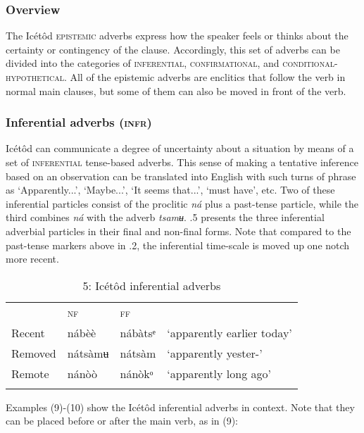 \subsubsection{Overview}

The Icétôd \textsc{epistemic} adverbs express how the speaker feels or thinks about the certainty or contingency of the clause. Accordingly, this set of adverbs can be divided into the categories of \textsc{inferential}, \textsc{confirmational}, and \textsc{conditional-hypothetical}. All of the epistemic adverbs are enclitics that follow the verb in normal main clauses, but some of them can also be moved in front of the verb.


\subsubsection{Inferential adverbs (\textsc{infr})}

Icétôd can communicate a degree of uncertainty about a situation by means of a set of \textsc{inferential} tense-based adverbs. This sense of making a tentative inference based on an observation can be translated into English with such turns of phrase as ‘Apparently...’, ‘Maybe...’, ‘It seems that...’, ‘must have’, etc. Two of these inferential particles consist of the proclitic \textit{ná} plus a past-tense particle, while the third combines \textit{ná} with the adverb \textit{tsamʉ}. .5 presents the three inferential adverbial particles in their final and non-final forms. Note that compared to the past-tense markers above in .2, the inferential time-scale is moved up one notch more recent. 


\begin{table}
\caption{5: Icétôd inferential adverbs}
\label{tab:9}


\begin{tabularx}{\textwidth}{XXXX} & \textsc{nf} & \textsc{ff} & \\
\lsptoprule
Recent & nábèè & nábàtsᵉ & ‘apparently earlier today’\\
Removed & nátsàmʉ & nátsàm & ‘apparently yester-’\\
Remote & nánòò & nánòkᵒ & ‘apparently long ago’\\
\lspbottomrule
\end{tabularx}
\end{table}
Examples (9)-(10) show the Icétôd inferential adverbs in context. Note that they can be placed before or after the main verb, as in (9):




